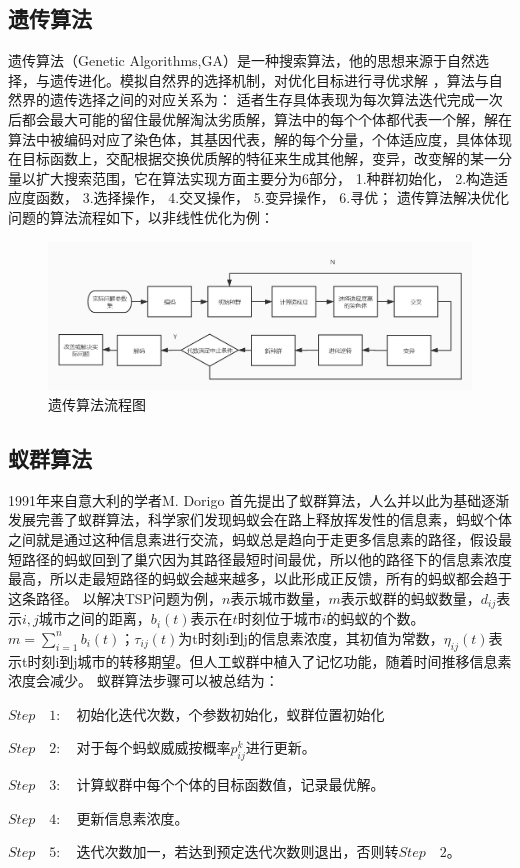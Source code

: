 \subsection{遗传算法}
遗传算法（Genetic Algorithms,GA）是一种搜索算法，他的思想来源于自然选择，与遗传进化。模拟自然界的选择机制，对优化目标进行寻优求解 ，算法与自然界的遗传选择之间的对应关系为：
适者生存具体表现为每次算法迭代完成一次后都会最大可能的留住最优解淘汰劣质解，算法中的每个个体都代表一个解，解在算法中被编码对应了染色体，其基因代表，解的每个分量，个体适应度，具体体现在目标函数上，交配根据交换优质解的特征来生成其他解，变异，改变解的某一分量以扩大搜索范围，它在算法实现方面主要分为6部分，
1.种群初始化，
2.构造适应度函数，
3.选择操作，
4.交叉操作，
5.变异操作，
6.寻优；
遗传算法解决优化问题的算法流程如下，以非线性优化为例：
\begin{figure}[H]
    \centering
    \includegraphics[width=13cm]{figure/ycsf.jpg}%
    \caption{遗传算法流程图}
    \label{fig-ycsf}
\end{figure}
\subsection{蚁群算法}
1991年来自意大利的学者M. Dorigo 首先提出了蚁群算法，人么并以此为基础逐渐发展完善了蚁群算法，科学家们发现蚂蚁会在路上释放挥发性的信息素，蚂蚁个体之间就是通过这种信息素进行交流，蚂蚁总是趋向于走更多信息素的路径，假设最短路径的蚂蚁回到了巢穴因为其路径最短时间最优，所以他的路径下的信息素浓度最高，所以走最短路径的蚂蚁会越来越多，以此形成正反馈，所有的蚂蚁都会趋于这条路径。
以解决TSP问题为例，$n$表示城市数量，$m$表示蚁群的蚂蚁数量，$d_{ij}$表示$i,j$城市之间的距离，$b_i(t)$表示在$t$时刻位于城市$i$的蚂蚁的个数。$m = \sum_{i=1}^n b_i(t)$；$\tau_{ij}(t)$为t时刻i到j的信息素浓度，其初值为常数，$\eta_{ij}(t)$表示t时刻i到j城市的转移期望。但人工蚁群中植入了记忆功能，随着时间推移信息素浓度会减少。
蚁群算法步骤可以被总结为：
\par
$Step \quad 1: \quad $初始化迭代次数，个参数初始化，蚁群位置初始化
\par
$Step \quad 2: \quad $对于每个蚂蚁威威按概率$p_{ij}^{k}$进行更新。
\par
$Step \quad 3: \quad $计算蚁群中每个个体的目标函数值，记录最优解。
\par
$Step \quad 4: \quad $更新信息素浓度。
\par
$Step \quad 5: \quad $迭代次数加一，若达到预定迭代次数则退出，否则转$Step \quad 2$。\\
